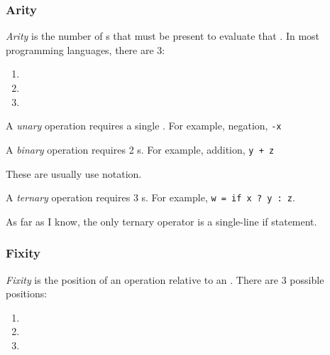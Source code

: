 \subsubsection{Arity}\label{subsubsec:Operator_Arity} %
\begin{definition}[Arity]\label{def:Arity}
  \emph{Arity} is the number of s that must be present to evaluate that .
  In most programming languages, there are 3:
  \begin{enumerate}[noitemsep]
  \item {}
  \item {}
  \item {}
  \end{enumerate}
\end{definition}

\begin{definition}[Unary]\label{def:Arity-Unary}
  A \emph{unary} operation requires a single .
  For example, negation, \texttt{-x}
\end{definition}

\begin{definition}[Binary]\label{def:Arity-Binary}
  A \emph{binary} operation requires 2 s.
  For example, addition, \texttt{y + z}

  \begin{remark}
    These are usually use  notation.
  \end{remark}
\end{definition}

\begin{definition}[Ternary]\label{def:Arity-Ternary}
  A \emph{ternary} operation requires 3 s.
  For example, \verb|w = if x ? y : z|.

  \begin{remark}
    As far as I know, the only ternary operator is a single-line if statement.
  \end{remark}
\end{definition}

\subsubsection{Fixity}\label{subsubsec:Operator_Fixity} %
\begin{definition}[Fixity]\label{def:Fixity}
  \emph{Fixity} is the position of an operation relative to an .
  There are 3 possible positions:
  \begin{enumerate}[noitemsep]
  \item {}
  \item {}
  \item {}
  \end{enumerate}
\end{definition}

